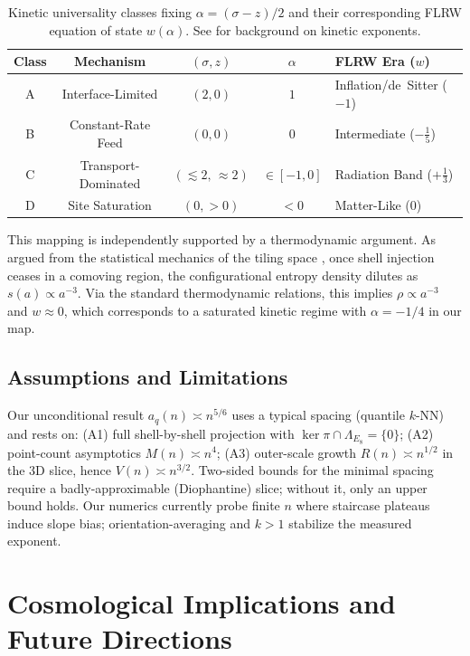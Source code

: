 \documentclass[universe,article,submit,pdftex,moreauthors]{Definitions/mdpi}
\begin{document}
\begin{table}[h!]
\centering
\caption{Kinetic universality classes fixing $\alpha=(\sigma-z)/2$ and their corresponding FLRW equation of state $w(\alpha)$. See \cite{Shirzad2023} for background on kinetic exponents.}
\label{tab:alpha-classes}
\begin{tabular}{c c c c l}
\toprule
Class & Mechanism & $(\sigma,z)$ & $\alpha$ & FLRW Era ($w$) \\
\midrule
A & Interface-Limited & $(2,0)$ & $1$ & Inflation/de~Sitter ($-1$) \\
B & Constant-Rate Feed & $(0,0)$ & $0$ & Intermediate ($-\tfrac{1}{5}$) \\
C & Transport-Dominated & $(\lesssim2,\,\approx2)$ & $\in[-1,0]$ & Radiation Band ($+\tfrac{1}{3}$) \\
D & Site Saturation & $(0,>0)$ & $<0$ & Matter-Like ($0$) \\
\bottomrule
\end{tabular}
\end{table}

This mapping is independently supported by a thermodynamic argument. As argued from the statistical mechanics of the tiling space \cite{Amaral2024}, once shell injection ceases in a comoving region, the configurational entropy density dilutes as $s(a)\propto a^{-3}$. Via the standard thermodynamic relations, this implies $\rho\propto a^{-3}$ and $w \approx 0$, which corresponds to a saturated kinetic regime with $\alpha=-1/4$ in our map.

\subsection*{Assumptions and Limitations}
Our unconditional result $a_q(n)\asymp n^{5/6}$ uses a typical spacing (quantile $k$-NN) and rests on: (A1) full shell-by-shell projection with $\ker\pi\cap\Lambda_{E_8}=\{0\}$; (A2) point-count asymptotics $M(n)\asymp n^4$; (A3) outer-scale growth $R(n)\asymp n^{1/2}$ in the 3D slice, hence $V(n)\asymp n^{3/2}$. Two-sided bounds for the minimal spacing require a badly-approximable (Diophantine) slice; without it, only an upper bound holds. Our numerics currently probe finite $n$ where staircase plateaus induce slope bias; orientation-averaging and $k>1$ stabilize the measured exponent.


\section{Cosmological Implications and Future Directions}
\label{sec:pheno}
\end{document}
